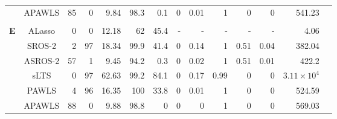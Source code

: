 \documentclass{article}\usepackage[]{graphicx}\usepackage[]{color}
\begin{document}
\begin{table}[thp]
\begin{center}
\begin{tabular}{ccrrrrrrrrrrrr}
	      & APAWLS & 85 & 0 & 9.84 & 
	      98.3 & 0.1 &
	      0 & 0.01 & 1
	      & 0 & 0 & 541.23\\
	      
	      \\
	       	  \multirow{8}{*}{{\bf E}}
	      & ALasso & 0 & 0 & 12.18 & 
	      62 & 45.4 & - & - & - & - & - & 4.06\\
	      
	      & SROS-2 & 2 & 97 & 18.34 & 
	      99.9 & 41.4 &
	      0 & 0.14 & 1
	      & 0.51 & 0.04 & 382.04\\
	      
	     & ASROS-2 & 57 & 1 & 9.45 & 
	      94.2 & 0.3 &
	      0 & 0.02 & 1
	      & 0.51 & 0.01 & 422.2\\
	      
	       & sLTS & 0 & 97 & 62.63 & 
	      99.2 & 84.1 &
	      0 & 0.17 & 0.99
	      & 0 & 0 & \ensuremath{3.11\times 10^{4}}\\
	      
	      & PAWLS & 4 & 96 & 16.35 & 
	      100 & 33.8 &
	      0 & 0.01 & 1
	      & 0 & 0 & 524.59\\
	      
	      & APAWLS & 88 & 0 & 9.88 & 
	      98.8 & 0 &
	      0 & 0 & 1
	      & 0 & 0 & 569.03\\
	      
	   \hline\hline
	
	\end{tabular}
	\end{center}
	\end{table}
	
\end{document}
